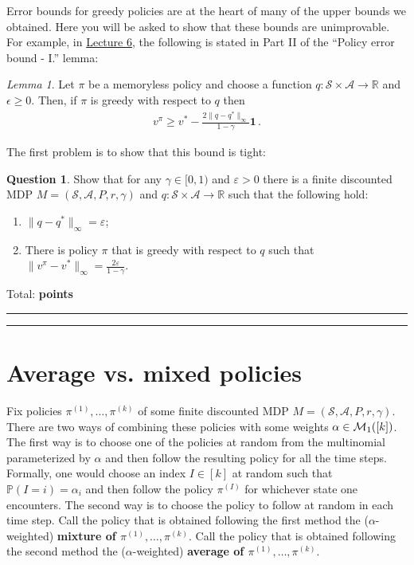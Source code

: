 \documentclass{article}
\newcommand{\norm}[1]{\| #1 \|}
\newcommand{\R}{\mathbb{R}}
\DeclareMathOperator*{\1}{\mathbbm{1}}
\newcommand{\Prob}[1]{\mathbb{P}( #1 )}
\newcommand{\0}{\mathbf{0}}
\newcounter{DocPoints}
\newcounter{QuestionPoints}
\newcommand{\tpoints}[1]{        	\ifthenelse{\isempty{#1}}	{	}	{		\addtocounter{DocPoints}{#1}
		\addtocounter{QuestionPoints}{#1}
	}													 	\par\mbox{}\par\noindent\hfill {Total: \bf \arabic{QuestionPoints}\xspace points}\par\mbox{}\par\hrule\hrule
	\setcounter{QuestionPoints}{0}
}
\theoremstyle{definition}
\newtheorem{question}{Question}
\theoremstyle{remark}
\theoremstyle{theorem}
\newtheorem{lemma}{Lemma}
\newcommand{\cS}{\mathcal{S}}
\newcommand{\cA}{\mathcal{A}}
\begin{document}
Error bounds for greedy policies are at the heart of many of the upper bounds we obtained.
Here you will be asked to show that these bounds are unimprovable.
For example, in
\href{http://rltheory.github.io/lecture-notes/planning-in-mdps/lec6/}{Lecture 6},
the following is stated in
Part II of the ``Policy error bound - I.'' lemma:
\begin{lemma}
Let $\pi$ be a memoryless policy and choose a function $q:\mathcal{S}\times\mathcal{A} \to \mathbb{R}$ and $\epsilon\ge 0$. Then,
if $\pi$ is greedy with respect to $q$ then
\begin{align*}
v^\pi \ge v^* - \frac{2\|q-q^*\|_\infty}{1-\gamma} \boldsymbol{1}\,.
\end{align*}
\end{lemma}
The first problem is to show that this bound is tight:
\begin{question}
Show that for any $\gamma\in [0,1)$ and $\varepsilon>0$ there is a finite
discounted MDP $M=(\cS,\cA,P,r,\gamma)$ and $q:\cS \times \cA \to \R$ such that the following hold:
\begin{enumerate}
\item $\norm{q-q^*}_\infty  =\varepsilon$;
\item There is policy $\pi$ that is greedy with respect to $q$ such that $\|v^\pi-v^*\|_\infty = \frac{2\varepsilon}{1-\gamma}$.
\end{enumerate}
\tpoints{10}
\end{question}


\section*{Average vs. mixed policies}
Fix policies $\pi^{(1)},\dots,\pi^{(k)}$ of some finite discounted MDP $M=(\cS,\cA,P,r,\gamma)$.
There are two ways of combining these policies with
some weights $\alpha\in \mathcal{M}_1([k])$.
The first way is to choose one of the policies at random from the multinomial parameterized by $\alpha$
and then follow the resulting policy for all the time steps.
Formally, one would choose
an index $I\in [k]$ at random such that $\Prob{I=i} = \alpha_i$
and then follow the policy $\pi^{(I)}$ for whichever state one encounters.
The second way is to choose the policy to follow at random in each time step.
Call the policy that is obtained following the first method the ($\alpha$-weighted) \textbf{mixture of $\pi^{(1)},\dots,\pi^{(k)}$}.
Call the policy that is obtained following the second method the ($\alpha$-weighted)
\textbf{average of $\pi^{(1)},\dots,\pi^{(k)}$}.
\end{document}
